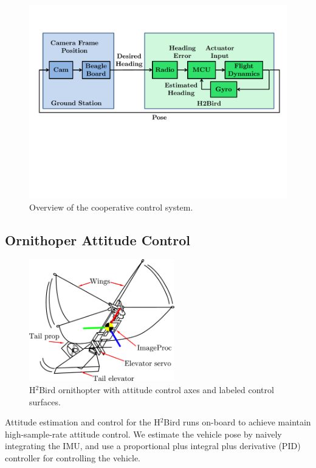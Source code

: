 \documentclass{aamas2013}
\begin{document}
\begin{figure}[tb]
\centering
\includegraphics[width=\linewidth]{figures/process_flow.pdf}
\caption{Overview of the cooperative control system.}
\label{fig:process_flow}
\end{figure}

\subsection{Ornithoper Attitude Control}

\begin{figure}[!tb]
\centering
\includegraphics[height=150pt]{figures/h2bird_axes.pdf}
\caption{H$^2$Bird ornithopter with attitude control axes and labeled control surfaces.}
\label{fig:h2Bird_axes}
\end{figure}

Attitude estimation and control for the H$^2$Bird runs on-board to achieve 
maintain high-sample-rate attitude control. We estimate the vehicle pose by naively
integrating the IMU, and use a proportional plus integral plus derivative (PID) 
controller for controlling the vehicle.
\end{document}

